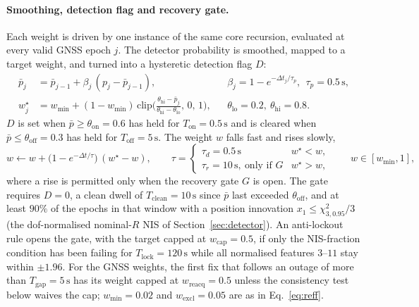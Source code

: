 \documentclass[journal]{IEEEtran}
\begin{document}
\paragraph{Smoothing, detection flag and recovery gate.}
Each weight is driven by one instance of the same core recursion, evaluated at every valid GNSS epoch $j$.
The detector probability is smoothed, mapped to a target weight, and turned into a hysteretic detection
flag $D$:
\begin{align}
\bar p_j &= \bar p_{j-1} + \beta_j\,(p_j - \bar p_{j-1}), && \beta_j = 1 - e^{-\Delta t_j/\tau_p},\ \ \tau_p = 0.5\,\mathrm{s}, \label{eq:pbar}\\
w^{\star}_j &= w_{\min} + (1-w_{\min})\,\mathrm{clip}\!\Big(\frac{\theta_{\mathrm{hi}} - \bar p_j}{\theta_{\mathrm{hi}}-\theta_{\mathrm{lo}}},\,0,\,1\Big), && \theta_{\mathrm{lo}} = 0.2,\ \theta_{\mathrm{hi}} = 0.8. \label{eq:target}
\end{align}
$D$ is set when $\bar p \ge \theta_{\mathrm{on}} = 0.6$ has held for $T_{\mathrm{on}} = 0.5\,\mathrm{s}$ and is
cleared when $\bar p \le \theta_{\mathrm{off}} = 0.3$ has held for $T_{\mathrm{off}} = 5\,\mathrm{s}$. The
weight $w$ falls fast and rises slowly,
\begin{equation}
w \leftarrow w + \big(1-e^{-\Delta t/\tau}\big)\,(w^{\star}-w),\qquad
\tau = \begin{cases}\tau_d = 0.5\,\mathrm{s} & w^{\star} < w,\\ \tau_r = 10\,\mathrm{s},\ \text{only if } G & w^{\star} > w,\end{cases}
\qquad w \in [w_{\min}, 1],
\label{eq:ramp}
\end{equation}
where a rise is permitted only when the recovery gate $G$ is open. The gate requires $D = 0$, a clean dwell of
$T_{\mathrm{clean}} = 10\,\mathrm{s}$ since $\bar p$ last exceeded $\theta_{\mathrm{off}}$, and at least $90\%$ of
the epochs in that window with a position innovation $x_1 \le \chi^2_{3,0.95}/3$ (the dof-normalised
nominal-$R$ NIS of Section~\ref{sec:detector}). An anti-lockout rule opens the gate, with the target capped at
$w_{\mathrm{cap}} = 0.5$, if only the NIS-fraction condition has been failing for $T_{\mathrm{lock}} = 120\,\mathrm{s}$
while all normalised features $3$--$11$ stay within $\pm 1.96$. For the GNSS weights, the first fix that follows an
outage of more than $T_{\mathrm{gap}} = 5\,\mathrm{s}$ has its weight capped at $w_{\mathrm{reacq}} = 0.5$ unless
the consistency test below waives the cap; $w_{\min} = 0.02$ and $w_{\mathrm{excl}} = 0.05$ are as in
Eq.~\eqref{eq:reff}.
\end{document}
